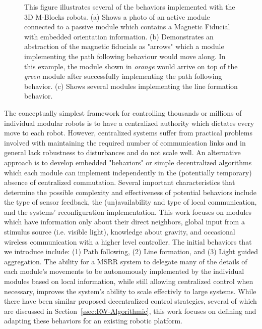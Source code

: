 \begin{figure}[t]
\begin{subfigure}[b]{\linewidth}
	\end{subfigure}
	
	
	\caption{This figure illustrates several of the behaviors implemented with the 3D M-Blocks robots. (a) Shows a photo of an active module connected to a passive module which contains a Magnetic Fiducial with embedded orientation information. (b) Demonstrates an abstraction of the magnetic fiducials as "arrows" which a module implementing the path following behaviour would move along. In this example, the module shown in \emph{orange} would arrive on top of the \emph{green} module after successfully implementing the path following behavior. (c) Shows several modules implementing the line formation behavior.}
	
	\label{fig:intro}
\end{figure}

The conceptually simplest framework for controlling thousands or millions of individual modular robots is to have a centralized authority which dictates every move to each robot. However, centralized systems suffer from practical problems involved with maintaining the required number of communication links and in general lack robustness to disturbances and do not scale well. An alternative approach is to develop embedded "behaviors" or simple decentralized algorithms which each module can implement independently in the (potentially temporary) absence of centralized commutation. Several important characteristics that determine the possible complexity and effectiveness of potential behaviors include the type of sensor feedback, the (un)availability and type of local communication, and the systems' reconfiguration implementation. This work focuses on modules which have information only about their direct neighbors, global input from a stimulus source (i.e. visible light), knowledge about gravity, and occasional wireless communication with a higher level controller. The initial behaviors that we introduce include: (1) Path following, (2) Line formation, and (3) Light guided aggregation. The ability for a MSRR system to delegate many of the details of each module's movements to be autonomously implemented by the individual modules based on local information, while still allowing centralized control when necessary, improves the system's ability to scale effectivly to large systems. While there have been similar proposed decentralized control strategies, several of which are discussed in Section~\ref{ssec:RW-Algorithmic}, this work focuses on defining and adapting these behaviors for an existing robotic platform.

